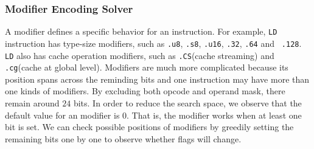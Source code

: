 \subsubsection{Modifier Encoding Solver}
A modifier defines a specific behavior for an instruction. For example,
{\tt LD} instruction has type-size modifiers, such as {\tt .u8}, {\tt .s8}, {\tt .u16}, {\tt .32}, {\tt .64} and {\tt 
.128}. {\tt LD} also has cache operation modifiers, such as {\tt .CS}(cache streaming) and {\tt .cg}(cache at global 
level). Modifiers are much more complicated because its position spans across the reminding bits and one instruction 
may have more than one kinds of modifiers. By excluding both opcode and operand mask, there remain around $24$ bits. In 
order to reduce the search space, we observe that the default value for an modifier is $0$. That is, the modifier works when at 
least one bit is set. We can check possible positions of modifiers by greedily setting the remaining bits one by one to 
observe whether flags will change.
